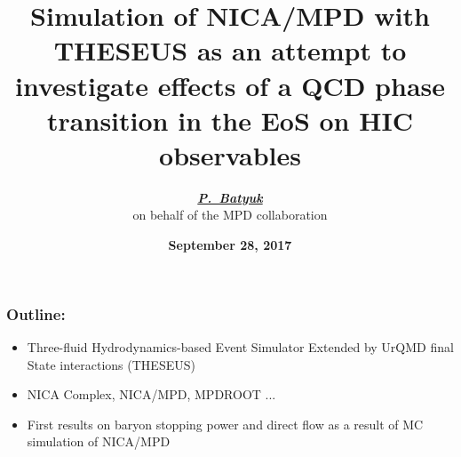 \documentclass[dvipsnames] {beamer}
\title[\bf Dubna, CSQCD 2017]{\textbf{\large {Simulation of NICA/MPD with THESEUS as an attempt to investigate effects of a QCD phase transition in the EoS on HIC observables}}}
\author[\bf P.~Batyuk]{\textit{\textbf{{\footnotesize \underline{P.~Batyuk}}}} \\
 on behalf of the MPD collaboration}
\institute{\url{pavel.batyuk@jinr.ru}  \\ VBLHEP, JINR}
\date{{\textbf{September 28, 2017}}}
\begin{document}
\maketitle

\begin{frame}
  \frametitle{Outline:}
  \bf
  \begin{itemize}
  \item Three-fluid Hydrodynamics-based Event Simulator Extended by UrQMD final State interactions (THESEUS) 
  \item NICA Complex, NICA/MPD, MPDROOT ...
  \item First results on baryon stopping power and direct flow as a result of MC simulation of NICA/MPD
  \end{itemize}
\end{frame}
\end{document}
